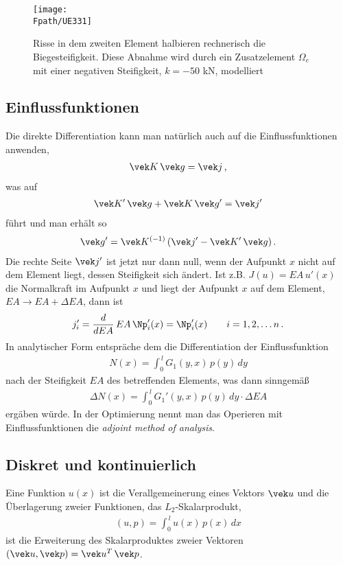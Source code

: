 \begin{figure}[tbp]
\centering
\texttt{[image: \\Fpath/UE331]}
\caption{Risse in dem zweiten Element halbieren rechnerisch die Biegesteifigkeit. Diese Abnahme wird durch ein Zusatzelement $\Omega_e$ mit einer negativen Steifigkeit, $k = - 50$ kN, modelliert }
\label{UE331}
\end{figure}%

\pagebreak
\textcolor{blau2}{\subsection*{Einflussfunktionen}}
Die direkte Differentiation kann man nat\"{u}rlich auch auf die Einflussfunktionen anwenden,
\begin{align}
\vek K\,\vek g = \vek j\,,
\end{align}
was auf
\begin{align}
\vek K'\,\vek g + \vek K\,\vek g' = \vek j'
\end{align}
f\"{u}hrt und man erh\"{a}lt so
\begin{align}
\vek g' =  \vek K^{(-1)}\,(\vek j' - \vek K'\,\vek g)\,.
\end{align}
Die rechte Seite $\vek j'$ ist jetzt nur dann null, wenn der Aufpunkt $x$ nicht auf dem Element liegt, dessen Steifigkeit sich \"{a}ndert. Ist z.B. $J(u) = EA\,u'(x)$ die Normalkraft im Aufpunkt $x$ und liegt der Aufpunkt $x$ auf dem Element, $EA \to EA + \Delta EA$, dann ist
\begin{align}
j_i' = \frac{d}{d EA}\,EA\,\Np_i'(x) = \Np_i'(x) \qquad i = 1,2,\ldots n\,.
\end{align}
In analytischer Form entspr\"{a}che dem die Differentiation der Einflussfunktion
\begin{align}
N(x) = \int_0^{\,l} G_1(y,x)\,p(y)\,dy
\end{align}
nach der Steifigkeit $EA$ des betreffenden Elements, was dann sinngem\"{a}{\ss}
\begin{align}
\Delta N(x) = \int_0^{\,l} G_1'(y,x)\,p(y)\,dy \cdot \Delta EA
\end{align}
erg\"{a}ben w\"{u}rde. In der Optimierung nennt man das Operieren mit Einflussfunktionen die {\em adjoint method of analysis\/}.

\textcolor{blau2}{\section{Diskret und kontinuierlich}}
Eine Funktion $u(x)$ ist die Verallgemeinerung eines Vektors $\vek u$ und die \"{U}berlagerung zweier Funktionen, das $L_2$-Skalarprodukt,
\begin{align}
(u, p) = \int_0^{\,l} u(x)\,p(x)\,dx
\end{align}
ist die Erweiterung des Skalarproduktes zweier Vektoren $(\vek u, \vek p) = \vek u^T\,\vek p$.

